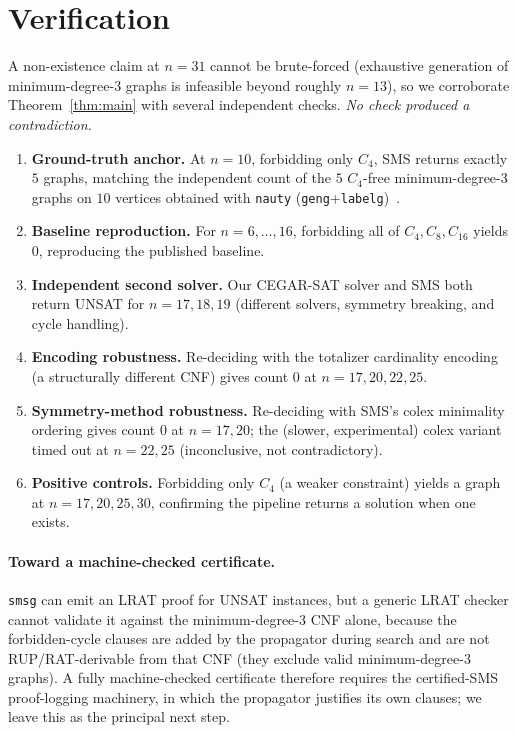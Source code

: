 \documentclass[11pt]{article}
\begin{document}
\section{Verification}
\label{sec:verification}

A non-existence claim at $n=31$ cannot be brute-forced (exhaustive generation of
minimum-degree-3 graphs is infeasible beyond roughly $n=13$), so we corroborate
Theorem~\ref{thm:main} with several independent checks. \emph{No check produced a
contradiction.}
\begin{enumerate}
  \item \textbf{Ground-truth anchor.} At $n=10$, forbidding only $C_4$, SMS returns
  exactly $5$ graphs, matching the independent count of the $5$ $C_4$-free
  minimum-degree-3 graphs on $10$ vertices obtained with \texttt{nauty}
  (\texttt{geng}+\texttt{labelg})~\cite{nauty}.
  \item \textbf{Baseline reproduction.} For $n = 6, \dots, 16$, forbidding all of
  $C_4, C_8, C_{16}$ yields $0$, reproducing the published baseline.
  \item \textbf{Independent second solver.} Our CEGAR-SAT solver and SMS both
  return UNSAT for $n = 17, 18, 19$ (different solvers, symmetry breaking, and
  cycle handling).
  \item \textbf{Encoding robustness.} Re-deciding with the totalizer cardinality
  encoding (a structurally different CNF) gives count $0$ at $n = 17, 20, 22, 25$.
  \item \textbf{Symmetry-method robustness.} Re-deciding with SMS's colex
  minimality ordering gives count $0$ at $n = 17, 20$; the (slower, experimental)
  colex variant timed out at $n = 22, 25$ (inconclusive, not contradictory).
  \item \textbf{Positive controls.} Forbidding only $C_4$ (a weaker constraint)
  yields a graph at $n = 17, 20, 25, 30$, confirming the pipeline returns a
  solution when one exists.
\end{enumerate}

\paragraph{Toward a machine-checked certificate.} \texttt{smsg} can emit an LRAT
proof for UNSAT instances, but a generic LRAT checker cannot validate it against
the minimum-degree-3 CNF alone, because the forbidden-cycle clauses are added by
the propagator during search and are not RUP/RAT-derivable from that CNF (they
exclude valid minimum-degree-3 graphs). A fully machine-checked certificate
therefore requires the certified-SMS proof-logging machinery, in which the
propagator justifies its own clauses; we leave this as the principal next step.
\end{document}
